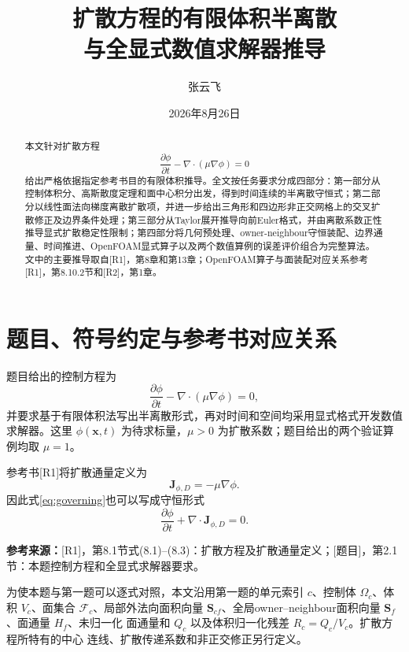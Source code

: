 \documentclass[UTF8,12pt,a4paper]{ctexart}
\title{\bfseries 扩散方程的有限体积半离散\\与全显式数值求解器推导}
\author{张云飞}
\date{2026年8月26日}
\numberwithin{equation}{section}
\newcommand{\Rone}{\textnormal{[R1]}}
\newcommand{\Rtwo}{\textnormal{[R2]}}
\newcommand{\Task}{\textnormal{[题目]}}
\newcommand{\source}[1]{%
  \par\smallskip
  \noindent\colorbox{sourcebg}{%
    \parbox{0.955\linewidth}{\raggedright\footnotesize\color{sourcegray}\textbf{参考来源：}#1}%
  }
  \par\smallskip
}
\newcommand{\Sf}{\bm S}
\newcommand{\xf}{\bm x}
\begin{document}
\maketitle

\begin{abstract}
本文针对扩散方程
\[
  \frac{\partial\phi}{\partial t}-\nabla\cdot(\mu\nabla\phi)=0
\]
给出严格依据指定参考书目的有限体积推导。全文按任务要求分成四部分：第一部分从控制体积分、高斯散度定理和面中心积分出发，得到时间连续的半离散守恒式；第二部分以线性面法向梯度离散扩散项，并进一步给出三角形和四边形非正交网格上的交叉扩散修正及边界条件处理；第三部分从Taylor展开推导向前Euler格式，并由离散系数正性推导显式扩散稳定性限制；第四部分将几何预处理、owner-neighbour守恒装配、边界通量、时间推进、OpenFOAM显式算子以及两个数值算例的误差评价组合为完整算法。文中的主要推导取自\Rone，第8章和第13章；OpenFOAM算子与面装配对应关系参考\Rone，第8.10.2节和\Rtwo，第1章。
\end{abstract}

\tableofcontents
\newpage

\section*{题目、符号约定与参考书对应关系}

题目给出的控制方程为
\begin{equation}
  \frac{\partial\phi}{\partial t}
  -\nabla\cdot(\mu\nabla\phi)=0,
  \label{eq:governing}
\end{equation}
并要求基于有限体积法写出半离散形式，再对时间和空间均采用显式格式开发数值求解器。这里 $\phi(\xf,t)$ 为待求标量，$\mu>0$ 为扩散系数；题目给出的两个验证算例均取 $\mu=1$。

参考书\Rone 将扩散通量定义为
\begin{equation}
  \bm J_{\phi,D}=-\mu\nabla\phi.
  \label{eq:diffusive_flux_definition}
\end{equation}
因此式\eqref{eq:governing}也可以写成守恒形式
\begin{equation}
  \frac{\partial\phi}{\partial t}
  +\nabla\cdot\bm J_{\phi,D}=0.
  \label{eq:conservative_flux_form}
\end{equation}

\source{\Rone，第8.1节式(8.1)--(8.3)：扩散方程及扩散通量定义；\Task，第2.1节：本题控制方程和全显式求解器要求。}

为使本题与第一题可以逐式对照，本文沿用第一题的单元索引 $c$、控制体
$\Omega_c$、体积 $V_c$、面集合 $\mathcal F_c$、局部外法向面积向量
$\Sf_{cf}$、全局owner--neighbour面积向量 $\Sf_f$、面通量 $H_f$、未归一化
面通量和 $Q_c$ 以及体积归一化残差 $R_c=Q_c/V_c$。扩散方程所特有的中心
连线、扩散传递系数和非正交修正另行定义。
\end{document}
